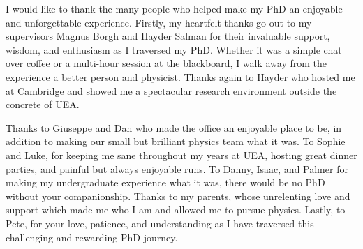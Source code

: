 I would like to thank the many people who helped make my PhD an enjoyable
and unforgettable experience.
Firstly, my heartfelt thanks go out to my supervisors Magnus Borgh and Hayder
Salman for their invaluable support, wisdom, and enthusiasm as I traversed my
PhD.
Whether it was a simple chat over coffee or a multi-hour session at the
blackboard, I walk away from the experience a better person and physicist.
Thanks again to Hayder who hosted me at Cambridge and showed me a spectacular
research environment outside the concrete of UEA\@.

Thanks to Giuseppe and Dan who made the office an enjoyable place to be, in
addition to making our small but brilliant physics team what it was.
To Sophie and Luke, for keeping me sane throughout my years at UEA, hosting
great dinner parties, and painful but always enjoyable runs.
To Danny, Isaac, and Palmer for making my undergraduate experience what it was,
there would be no PhD without your companionship.
Thanks to my parents, whose unrelenting love and support which made me who I am
and allowed me to pursue physics.
Lastly, to Pete, for your love, patience, and understanding as I have traversed
this challenging and rewarding PhD journey.
